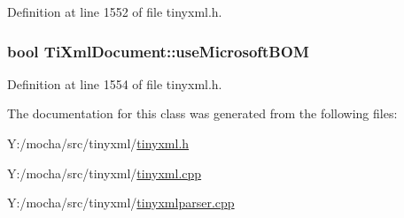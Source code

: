 Definition at line 1552 of file tinyxml.h.

\hypertarget{class_ti_xml_document_a4d5400dec9bfb55c640428de33297886}{
\subsubsection[{useMicrosoftBOM}]{\setlength{\rightskip}{0pt plus 5cm}bool {\bf TiXmlDocument::useMicrosoftBOM}}}
\label{class_ti_xml_document_a4d5400dec9bfb55c640428de33297886}


Definition at line 1554 of file tinyxml.h.



The documentation for this class was generated from the following files:\begin{DoxyCompactItemize}
\item 
Y:/mocha/src/tinyxml/\hyperlink{tinyxml_8h}{tinyxml.h}\item 
Y:/mocha/src/tinyxml/\hyperlink{tinyxml_8cpp}{tinyxml.cpp}\item 
Y:/mocha/src/tinyxml/\hyperlink{tinyxmlparser_8cpp}{tinyxmlparser.cpp}\end{DoxyCompactItemize}
